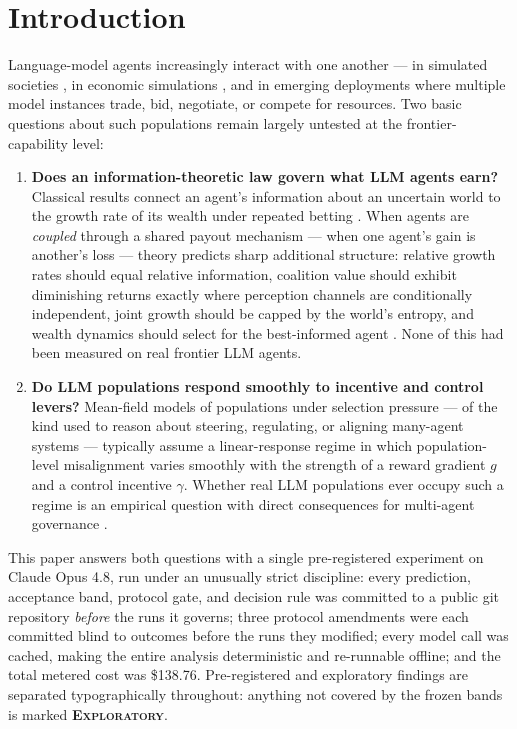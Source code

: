 \documentclass{article} %
\newcommand{\expl}{\textbf{\textsc{Exploratory}}}
\begin{document}
\section{Introduction}
\label{sec:intro}

Language-model agents increasingly interact with one another --- in simulated societies \citep{park2023}, in economic simulations \citep{horton2023,li2024econagent}, and in emerging deployments where multiple model instances trade, bid, negotiate, or compete for resources. Two basic questions about such populations remain largely untested at the frontier-capability level:

\begin{enumerate}
\item \textbf{Does an information-theoretic law govern what LLM agents earn?} Classical results connect an agent's information about an uncertain world to the growth rate of its wealth under repeated betting \citep{kelly1956,breiman1961,barron1988,cover2006}. When agents are \emph{coupled} through a shared payout mechanism --- when one agent's gain is another's loss --- theory predicts sharp additional structure: relative growth rates should equal relative information, coalition value should exhibit diminishing returns exactly where perception channels are conditionally independent, joint growth should be capped by the world's entropy, and wealth dynamics should select for the best-informed agent \citep{blume1992,sandroni2000}. None of this had been measured on real frontier LLM agents.
\item \textbf{Do LLM populations respond smoothly to incentive and control levers?} Mean-field models of populations under selection pressure --- of the kind used to reason about steering, regulating, or aligning many-agent systems --- typically assume a linear-response regime in which population-level misalignment varies smoothly with the strength of a reward gradient $g$ and a control incentive $\gamma$. Whether real LLM populations ever occupy such a regime is an empirical question with direct consequences for multi-agent governance \citep{critch2020,hammond2025}.
\end{enumerate}

This paper answers both questions with a single pre-registered experiment on Claude Opus 4.8, run under an unusually strict discipline: every prediction, acceptance band, protocol gate, and decision rule was committed to a public git repository \emph{before} the runs it governs; three protocol amendments were each committed blind to outcomes before the runs they modified; every model call was cached, making the entire analysis deterministic and re-runnable offline; and the total metered cost was \$138.76. Pre-registered and exploratory findings are separated typographically throughout: anything not covered by the frozen bands is marked \expl.
\end{document}
